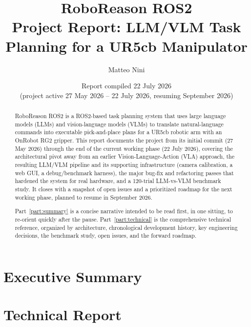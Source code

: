 \documentclass[11pt]{article}
\title{
  \vspace{-1.5cm}
  {\Huge\bfseries\color{rrblue} RoboReason ROS2}\\[0.4cm]
  {\Large Project Report: LLM/VLM Task Planning for a UR5cb Manipulator}
}
\author{Matteo Nini}
\date{Report compiled 22 July 2026 \\ \small (project active 27 May 2026 -- 22 July 2026, resuming September 2026)}
\begin{document}
\maketitle
\thispagestyle{empty}

\begin{abstract}
\noindent
RoboReason ROS2 is a ROS2-based task planning system that uses large language
models (LLMs) and vision-language models (VLMs) to translate natural-language
commands into executable pick-and-place plans for a UR5cb robotic arm with an
OnRobot RG2 gripper. This report documents the project from its initial
commit (27 May 2026) through the end of the current working phase
(22 July 2026), covering the architectural pivot away from an earlier
Vision-Language-Action (VLA) approach, the resulting LLM/VLM pipeline and its
supporting infrastructure (camera calibration, a web GUI, a debug/benchmark
harness), the major bug-fix and refactoring passes that hardened the system
for real hardware, and a 120-trial LLM-vs-VLM benchmark study. It closes with
a snapshot of open issues and a prioritized roadmap for the next working
phase, planned to resume in September 2026.

Part~\ref{part:summary} is a concise narrative intended to be read first,
in one sitting, to re-orient quickly after the pause. Part~\ref{part:technical}
is the comprehensive technical reference, organized by architecture,
chronological development history, key engineering decisions, the benchmark
study, open issues, and the forward roadmap.
\end{abstract}

\newpage
\tableofcontents
\newpage

\part{Executive Summary}
\label{part:summary}


\newpage
\part{Technical Report}
\label{part:technical}









\end{document}
